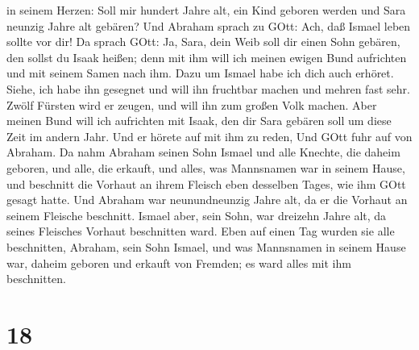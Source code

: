 in seinem Herzen: Soll mir hundert Jahre alt, ein Kind geboren werden
und Sara neunzig Jahre alt gebären?  Und Abraham sprach zu
GOtt: Ach, daß Ismael leben sollte vor dir!  Da sprach
GOtt: Ja, Sara, dein Weib soll dir einen Sohn gebären, den sollst du
Isaak heißen; denn mit ihm will ich meinen ewigen Bund aufrichten und
mit seinem Samen nach ihm.  Dazu um Ismael habe ich dich
auch erhöret. Siehe, ich habe ihn gesegnet und will ihn fruchtbar machen
und mehren fast sehr. Zwölf Fürsten wird er zeugen, und will ihn zum
großen Volk machen.  Aber meinen Bund will ich aufrichten
mit Isaak, den dir Sara gebären soll um diese Zeit im andern Jahr.
 Und er hörete auf mit ihm zu reden, Und GOtt fuhr auf von
Abraham.  Da nahm Abraham seinen Sohn Ismael und alle
Knechte, die daheim geboren, und alle, die erkauft, und alles, was
Mannsnamen war in seinem Hause, und beschnitt die Vorhaut an ihrem
Fleisch eben desselben Tages, wie ihm GOtt gesagt hatte. 
Und Abraham war neunundneunzig Jahre alt, da er die Vorhaut an seinem
Fleische beschnitt.  Ismael aber, sein Sohn, war dreizehn
Jahre alt, da seines Fleisches Vorhaut beschnitten ward. 
Eben auf einen Tag wurden sie alle beschnitten, Abraham, sein Sohn
Ismael,  und was Mannsnamen in seinem Hause war, daheim
geboren und erkauft von Fremden; es ward alles mit ihm beschnitten.

\hypertarget{section-17}{%
\section{18}\label{section-17}}

